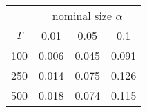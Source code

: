 % 
\begin{tabular}{cccc}
  \hline
  & \multicolumn{3}{c}{nominal size $\alpha$} \\
 $T$ & 0.01 & 0.05 & 0.1 \\
 \hline
100 & 0.006 & 0.045 & 0.091 \\ 
  250 & 0.014 & 0.075 & 0.126 \\ 
  500 & 0.018 & 0.074 & 0.115 \\ 
   \hline
\end{tabular}
